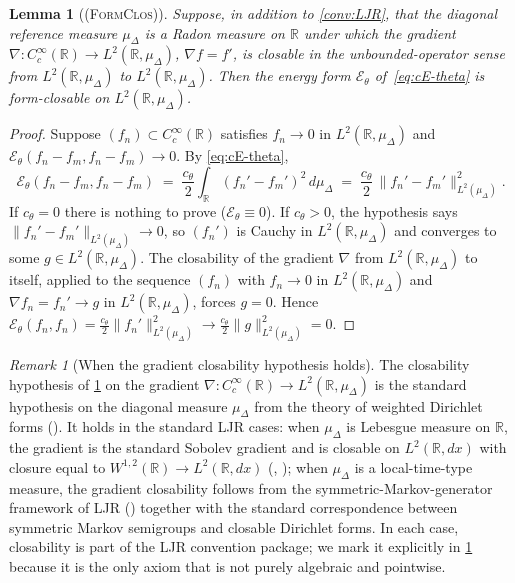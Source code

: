 \documentclass[11pt,reqno]{amsart}
\theoremstyle{plain}
\newtheorem{lemma}[theorem]{Lemma}
\theoremstyle{definition}
\theoremstyle{remark}
\newtheorem{remark}[theorem]{Remark}
\newcommand{\R}{\mathbb{R}}
\newcommand{\cE}{\mathcal E}
\begin{document}
\begin{lemma}[\normalfont\textsc{(FormClos)}]\label{lem:formclos}
Suppose, in addition to \cref{conv:LJR}, that the diagonal
reference measure $\mu_{\Delta}$ is a Radon measure on $\R$
under which the gradient
$\nabla\colon C_{c}^{\infty}(\R)\to L^{2}(\R,\mu_{\Delta})$,
$\nabla f=f'$, is closable in the unbounded-operator sense from
$L^{2}(\R,\mu_{\Delta})$ to $L^{2}(\R,\mu_{\Delta})$. Then the
energy form $\cE_{\theta}$ of~\eqref{eq:cE-theta} is
form-closable on $L^{2}(\R,\mu_{\Delta})$.
\end{lemma}

\begin{proof}
Suppose $(f_{n})\subset C_{c}^{\infty}(\R)$ satisfies
$f_{n}\to 0$ in $L^{2}(\R,\mu_{\Delta})$ and
$\cE_{\theta}(f_{n}-f_{m},f_{n}-f_{m})\to 0$. By
\eqref{eq:cE-theta},
\[
  \cE_{\theta}(f_{n}-f_{m},f_{n}-f_{m})
  \;=\;\frac{c_{\theta}}{2}\!\int_{\R}(f_{n}'-f_{m}')^{2}\,d\mu_{\Delta}
  \;=\;\frac{c_{\theta}}{2}\,\|f_{n}'-f_{m}'\|_{L^{2}(\mu_{\Delta})}^{2}.
\]
If $c_{\theta}=0$ there is nothing to prove ($\cE_{\theta}\equiv 0$).
If $c_{\theta}>0$, the hypothesis says
$\|f_{n}'-f_{m}'\|_{L^{2}(\mu_{\Delta})}\to 0$, so $(f_{n}')$ is
Cauchy in $L^{2}(\R,\mu_{\Delta})$ and converges to some
$g\in L^{2}(\R,\mu_{\Delta})$. The closability of the gradient
$\nabla$ from $L^{2}(\R,\mu_{\Delta})$ to itself, applied to the
sequence $(f_{n})$ with $f_{n}\to 0$ in $L^{2}(\R,\mu_{\Delta})$
and $\nabla f_{n}=f_{n}'\to g$ in $L^{2}(\R,\mu_{\Delta})$,
forces $g=0$. Hence
$\cE_{\theta}(f_{n},f_{n})=\frac{c_{\theta}}{2}\|f_{n}'\|_{L^{2}(\mu_{\Delta})}^{2}\to\frac{c_{\theta}}{2}\|g\|_{L^{2}(\mu_{\Delta})}^{2}=0$.
\end{proof}

\begin{remark}[When the gradient closability hypothesis holds]\label{rem:gradient-closability}
The closability hypothesis of \cref{lem:formclos} on the
gradient $\nabla\colon C_{c}^{\infty}(\R)\to L^{2}(\R,\mu_{\Delta})$
is the standard hypothesis on the diagonal measure
$\mu_{\Delta}$ from the theory of weighted Dirichlet forms
(\cite[Ch.~1]{FukushimaOshimaTakeda}). It holds in the standard
LJR cases: when $\mu_{\Delta}$ is Lebesgue measure on $\R$, the
gradient is the standard Sobolev gradient and is closable on
$L^{2}(\R,dx)$ with closure equal to $W^{1,2}(\R)\to L^{2}(\R,dx)$
(\cite[Ch.~1, \S 1.4]{FukushimaOshimaTakeda},
\cite[Ch.~1]{BakryGentilLedoux}); when $\mu_{\Delta}$ is a
local-time-type measure, the gradient closability follows from
the symmetric-Markov-generator framework of LJR
(\cite{LeJanRaimond2004}) together with the standard
correspondence between symmetric Markov semigroups and closable
Dirichlet forms. In each case, closability is part of the
LJR convention package; we mark it explicitly in
\cref{lem:formclos} because it is the only axiom that is not
purely algebraic and pointwise.
\end{remark}
\end{document}
